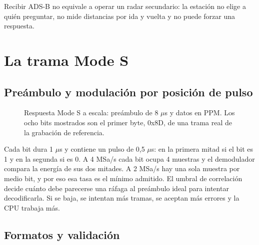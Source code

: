 Recibir ADS-B no equivale a operar un radar secundario: la estación no elige a quién preguntar, no mide distancias por ida y vuelta y no puede forzar una respuesta.

\section{La trama Mode S}
\label{sec:a-trama}

\subsection{Preámbulo y modulación por posición de pulso}

\begin{figure}[H]
\centering
\resizebox{\linewidth}{!}{}
\caption{Respuesta Mode S a escala: preámbulo de 8 $\mu$s y datos en PPM. Los ocho bits mostrados son el primer byte, 0x8D, de una trama real de la grabación de referencia.}
\label{fig:a-trama}
\end{figure}

Cada bit dura 1 $\mu$s y contiene un pulso de 0,5 $\mu$s: en la primera mitad si el bit es 1 y en la segunda si es 0. A 4 MSa/s cada bit ocupa 4 muestras y el demodulador compara la energía de sus dos mitades. A 2 MSa/s hay una sola muestra por medio bit, y por eso esa tasa es el mínimo admitido. El umbral de correlación decide cuánto debe parecerse una ráfaga al preámbulo ideal para intentar decodificarla. Si se baja, se intentan más tramas, se aceptan más errores y la CPU trabaja más.

\subsection{Formatos y validación}

